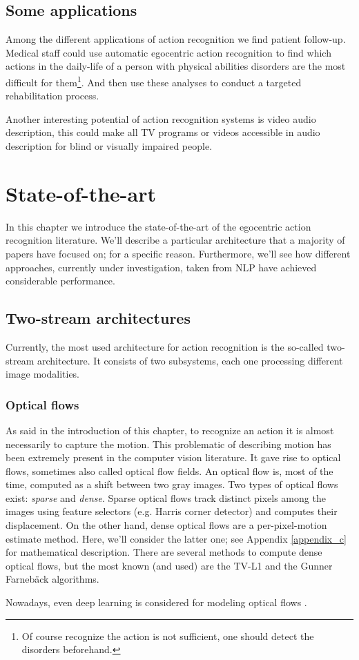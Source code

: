 \documentclass[12pt, a4paper]{report}
\begin{document}
				\subsection*{Some applications}
					Among the different applications of action recognition we find patient follow-up.
					Medical staff could use automatic egocentric action recognition to find which actions in the daily-life of a person with physical abilities disorders are the most difficult for them\footnote{Of course recognize the action is not sufficient, one should detect the disorders beforehand.}.
					And then use these analyses to conduct a targeted rehabilitation process.
					\par
					Another interesting potential of action recognition systems is video audio description, this could make all TV programs or videos accessible in audio description for blind or visually impaired people.
		\section{State-of-the-art}
			In this chapter we introduce the state-of-the-art of the egocentric action recognition literature.
			We'll describe a particular architecture that a majority of papers have focused on; for a specific reason.
			Furthermore, we'll see how different approaches, currently under investigation, taken from NLP have achieved considerable performance.
			\subsection{Two-stream architectures}\label{twostream}
				Currently, the most used architecture for action recognition is the so-called two-stream architecture.
				It consists of two subsystems, each one processing different image modalities.
				\subsubsection{Optical flows}
					As said in the introduction of this chapter, to recognize an action it is almost necessarily to capture the motion.
					This problematic of describing motion has been extremely present in the computer vision literature.
					It gave rise to optical flows, sometimes also called optical flow fields.
					An optical flow is, most of the time, computed as a shift between two gray images.
					Two types of optical flows exist: {\itshape sparse} and {\itshape dense}.
					Sparse optical flows track distinct pixels among the images using feature selectors (e.g. Harris corner detector) and computes their displacement.
					On the other hand, dense optical flows are a per-pixel-motion estimate method.
					Here, we'll consider the latter one; see Appendix \ref{appendix_c} for mathematical description.
					There are several methods to compute dense optical flows, but the most known (and used) are the TV-L1 \cite{perez2013tv} and the Gunner Farnebäck \cite{farneback2003two} algorithms.
					\par
					Nowadays, even deep learning is considered for modeling optical flows \cite{hur2020optical}.
\end{document}
